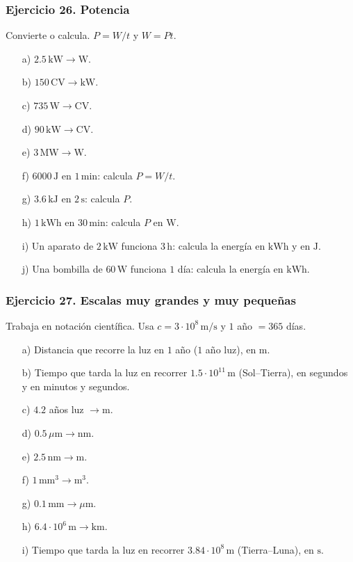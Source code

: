 \subsubsection*{Ejercicio 26. Potencia}

Convierte o calcula. $P=W/t$ y $W=Pt$.

\begin{enumerate}
    \item[a)] $2.5\,\mathrm{kW}\rightarrow\mathrm{W}$.
    \item[b)] $150\,\mathrm{CV}\rightarrow\mathrm{kW}$.
    \item[c)] $735\,\mathrm{W}\rightarrow\mathrm{CV}$.
    \item[d)] $90\,\mathrm{kW}\rightarrow\mathrm{CV}$.
    \item[e)] $3\,\mathrm{MW}\rightarrow\mathrm{W}$.
    \item[f)] $6000\,\mathrm{J}$ en $1\,\mathrm{min}$:
    calcula $P=W/t$.
    \item[g)] $3.6\,\mathrm{kJ}$ en $2\,\mathrm{s}$:
    calcula $P$.
    \item[h)] $1\,\mathrm{kWh}$ en $30\,\mathrm{min}$:
    calcula $P$ en $\mathrm{W}$.
    \item[i)] Un aparato de $2\,\mathrm{kW}$ funciona $3\,\mathrm{h}$:
    calcula la energía en $\mathrm{kWh}$ y en $\mathrm{J}$.
    \item[j)] Una bombilla de $60\,\mathrm{W}$ funciona $1$ día:
    calcula la energía en $\mathrm{kWh}$.
\end{enumerate}

\subsubsection*{Ejercicio 27. Escalas muy grandes y muy pequeñas}

Trabaja en notación científica.
Usa $c=3\cdot10^8\,\mathrm{m/s}$ y $1$ año $=365$ días.

\begin{enumerate}
    \item[a)] Distancia que recorre la luz en $1$ año
    ($1$ año luz), en $\mathrm{m}$.
    \item[b)] Tiempo que tarda la luz en recorrer
    $1.5\cdot10^{11}\,\mathrm{m}$ (Sol--Tierra),
    en segundos y en minutos y segundos.
    \item[c)] $4.2$ años luz $\rightarrow\mathrm{m}$.
    \item[d)] $0.5\,\mu\mathrm{m}\rightarrow\mathrm{nm}$.
    \item[e)] $2.5\,\mathrm{nm}\rightarrow\mathrm{m}$.
    \item[f)] $1\,\mathrm{mm^3}\rightarrow\mathrm{m^3}$.
    \item[g)] $0.1\,\mathrm{mm}\rightarrow\mu\mathrm{m}$.
    \item[h)] $6.4\cdot10^6\,\mathrm{m}\rightarrow\mathrm{km}$.
    \item[i)] Tiempo que tarda la luz en recorrer
    $3.84\cdot10^8\,\mathrm{m}$ (Tierra--Luna), en $\mathrm{s}$.
\end{enumerate}

